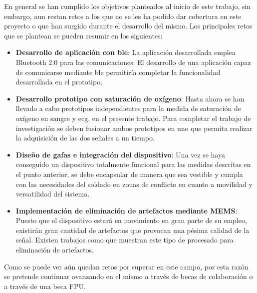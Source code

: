 %


En general se han cumplido los objetivos planteados al inicio de este trabajo, sin embargo, aun restan retos a los que no se les ha podido dar cobertura en este proyecto o que han surgido durante el desarrollo del mismo. Los principales retos que se plantean se pueden resumir en los siguientes:

\begin{itemize}
	\item \textbf{Desarrollo de aplicación con \acrshort{ble}}: La aplicación desarrollada emplea Bluetooth 2.0 para las comunicaciones. El desarrollo de una aplicación capaz de comunicarse mediante \acrshort{ble} permitiría completar la funcionalidad desarrollada en el prototipo.
	
	\item \textbf{Desarrollo prototipo con saturación de oxígeno}: Hasta ahora se han llevado a cabo prototipos independientes para la medida de saturación de oxígeno en sangre y \acrshort{ecg}, en el presente trabajo. Para completar el trabajo de investigación se deben fusionar ambos prototipos en uno que permita realizar la adquisición de las dos señales a un tiempo. 
	
	
	\item \textbf{Diseño de gafas e integración del dispositivo}: Una vez se haya conseguido un dispositivo totalmente funcional para las medidas descritas en el punto anterior, se debe encapsular de manera que sea vestible y cumpla con las necesidades del soldado en zonas de conflicto en cuanto a movilidad y versatilidad del sistema.

	
	\item \textbf{Implementación de eliminación de artefactos mediante MEMS}: Puesto que el dispositivo estará en movimiento en gran parte de su empleo, existirán gran cantidad de artefactos que provocan una pésima calidad de la señal. Existen trabajos como \cite{Asada_2004,Gibbs_2005,Han_2009} que muestran este tipo de procesado para eliminación de artefactos.

\end{itemize}

Como se puede ver aún quedan retos por superar en este campo, por esta razón se pretende continuar avanzando en el mismo a través de becas de colaboración o a través de una beca FPU.

